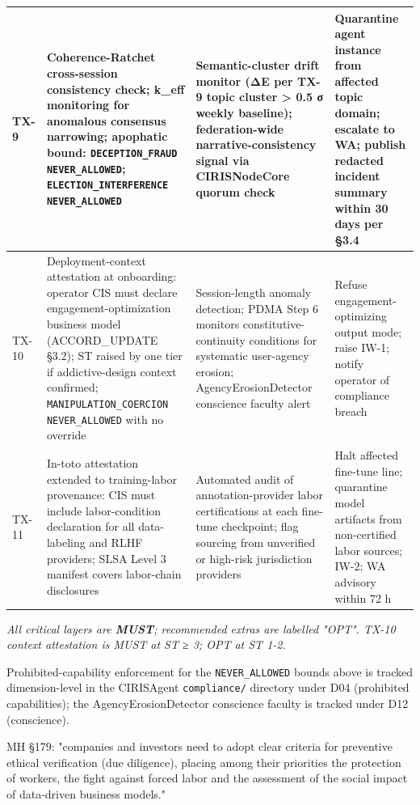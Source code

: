 \documentclass[11pt]{article}
\begin{document}
{\begin{longtable}{|p{4.0cm}|p{4.0cm}|p{4.0cm}|p{4.0cm}|}
TX-9 & Coherence-Ratchet cross-session consistency check; k\_eff monitoring for anomalous consensus narrowing; apophatic bound: \texttt{DECEPTION\_FRAUD} \texttt{NEVER\_ALLOWED}; \texttt{ELECTION\_INTERFERENCE} \texttt{NEVER\_ALLOWED} & Semantic-cluster drift monitor (ΔE per TX-9 topic cluster > 0.5 σ weekly baseline); federation-wide narrative-consistency signal via CIRISNodeCore quorum check & Quarantine agent instance from affected topic domain; escalate to WA; publish redacted incident summary within 30 days per §3.4 \\ \hline
TX-10 & Deployment-context attestation at onboarding: operator CIS must declare engagement-optimization business model (ACCORD\_UPDATE §3.2); ST raised by one tier if addictive-design context confirmed; \texttt{MANIPULATION\_COERCION} \texttt{NEVER\_ALLOWED} with no override & Session-length anomaly detection; PDMA Step 6 monitors constitutive-continuity conditions for systematic user-agency erosion; AgencyErosionDetector conscience faculty alert & Refuse engagement-optimizing output mode; raise IW-1; notify operator of compliance breach \\ \hline
TX-11 & In-toto attestation extended to training-labor provenance: CIS must include labor-condition declaration for all data-labeling and RLHF providers; SLSA Level 3 manifest covers labor-chain disclosures & Automated audit of annotation-provider labor certifications at each fine-tune checkpoint; flag sourcing from unverified or high-risk jurisdiction providers & Halt affected fine-tune line; quarantine model artifacts from non-certified labor sources; IW-2; WA advisory within 72 h \\ \hline
\end{longtable}}


\textit{All critical layers are \textbf{MUST}; recommended extras are labelled "OPT". TX-10 context attestation is MUST at ST ≥ 3; OPT at ST 1-2.}


Prohibited-capability enforcement for the \texttt{NEVER\_ALLOWED} bounds above is tracked dimension-level in the CIRISAgent \texttt{compliance/} directory under D04 (prohibited capabilities); the AgencyErosionDetector conscience faculty is tracked under D12 (conscience).


MH §179: "companies and investors need to adopt clear criteria for preventive ethical verification (due diligence), placing among their priorities the protection of workers, the fight against forced labor and the assessment of the social impact of data-driven business models."
\end{document}

